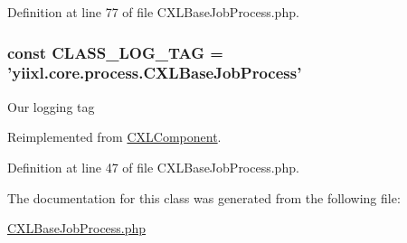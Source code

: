 Definition at line 77 of file CXLBaseJobProcess.php.

\hypertarget{classCXLBaseJobProcess_aa607ab5e557e6ebb60b85c5a20ad067f}{
\subsubsection[{CLASS\_\-LOG\_\-TAG}]{\setlength{\rightskip}{0pt plus 5cm}const {\bf CLASS\_\-LOG\_\-TAG} = 'yiixl.core.process.CXLBaseJobProcess'}}
\label{classCXLBaseJobProcess_aa607ab5e557e6ebb60b85c5a20ad067f}
Our logging tag 

Reimplemented from \hyperlink{classCXLComponent_aa607ab5e557e6ebb60b85c5a20ad067f}{CXLComponent}.



Definition at line 47 of file CXLBaseJobProcess.php.



The documentation for this class was generated from the following file:\begin{DoxyCompactItemize}
\item 
\hyperlink{CXLBaseJobProcess_8php}{CXLBaseJobProcess.php}\end{DoxyCompactItemize}
